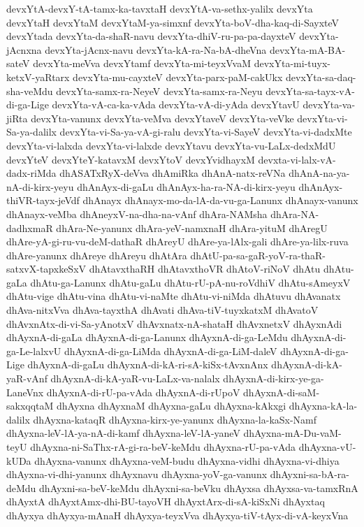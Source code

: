 {devxYtA-devxY-tA-tamx-ka-tavxtaH
devxYtA-va-sethx-yalilx
devxYta
devxYtaH
devxYtaM
devxYtaM-ya-simxnf
devxYta-boV-dha-kaq-di-SayxteV
devxYtada
devxYta-da-shaR-navu
devxYta-dhiV-ru-pa-pa-dayxteV
devxYta-jAcnxna
devxYta-jAcnx-navu
devxYta-kA-ra-Na-bA-dheVna
devxYta-mA-BA-sateV
devxYta-meVva
devxYtamf
devxYta-mi-teyxVvaM
devxYta-mi-tuyx-ketxV-yaRtarx
devxYta-mu-cayxteV
devxYta-parx-paM-cakUkx
devxYta-sa-daq-sha-veMdu
devxYta-samx-ra-NeyeV
devxYta-samx-ra-Neyu
devxYta-sa-tayx-vA-di-ga-Lige
devxYta-vA-ca-ka-vAda
devxYta-vA-di-yAda
devxYtavU
devxYta-va-jiRta
devxYta-vanunx
devxYta-veMva
devxYtaveV
devxYta-veVke
devxYta-vi-Sa-ya-dalilx
devxYta-vi-Sa-ya-vA-gi-ralu
devxYta-vi-SayeV
devxYta-vi-dadxMte
devxYta-vi-lalxda
devxYta-vi-lalxde
devxYtavu
devxYta-vu-LaLx-dedxMdU
devxYteV
devxYteY-katavxM
devxYtoV
devxYvidhayxM
devxta-vi-lalx-vA-dadx-riMda
dhASATxRyX-deVva
dhAmiRka
dhAnA-natx-reVNa
dhAnA-na-ya-nA-di-kirx-yeyu
dhAnAyx-di-gaLu
dhAnAyx-ha-ra-NA-di-kirx-yeyu
dhAnAyx-thiVR-tayx-jeVdf
dhAnayx
dhAnayx-mo-da-lA-da-vu-ga-Lanunx
dhAnayx-vanunx
dhAnayx-veMba
dhAneyxV-na-dha-na-vAnf
dhAra-NAMsha
dhAra-NA-dadhxmaR
dhAra-Ne-yanunx
dhAra-yeV-namxnaH
dhAra-yituM
dhAregU
dhAre-yA-gi-ru-vu-deM-dathaR
dhAreyU
dhAre-ya-lAlx-gali
dhAre-ya-lilx-ruva
dhAre-yanunx
dhAreye
dhAreyu
dhAtAra
dhAtU-pa-sa-gaR-yoV-ra-thaR-satxvX-tapxkeSxV
dhAtavxthaRH
dhAtavxthoVR
dhAtoV-riNoV
dhAtu
dhAtu-gaLa
dhAtu-ga-Lanunx
dhAtu-gaLu
dhAtu-rU-pA-nu-roVdhiV
dhAtu-sAmeyxV
dhAtu-vige
dhAtu-vina
dhAtu-vi-naMte
dhAtu-vi-niMda
dhAtuvu
dhAvanatx
dhAva-nitxVva
dhAva-tayxthA
dhAvati
dhAva-tiV-tuyxkatxM
dhAvatoV
dhAvxnAtx-di-vi-Sa-yAnotxV
dhAvxnatx-nA-shataH
dhAvxnetxV
dhAyxnAdi
dhAyxnA-di-gaLa
dhAyxnA-di-ga-Lanunx
dhAyxnA-di-ga-LeMdu
dhAyxnA-di-ga-Le-lalxvU
dhAyxnA-di-ga-LiMda
dhAyxnA-di-ga-LiM-daleV
dhAyxnA-di-ga-Lige
dhAyxnA-di-gaLu
dhAyxnA-di-kA-ri-sA-kiSx-tAvxnAnx
dhAyxnA-di-kA-yaR-vAnf
dhAyxnA-di-kA-yaR-vu-LaLx-va-nalalx
dhAyxnA-di-kirx-ye-ga-LaneVnx
dhAyxnA-di-rU-pa-vAda
dhAyxnA-di-rUpoV
dhAyxnA-di-saM-sakxqqtaM
dhAyxna
dhAyxnaM
dhAyxna-gaLu
dhAyxna-kAkxgi
dhAyxna-kA-la-dalilx
dhAyxna-kataqR
dhAyxna-kirx-ye-yanunx
dhAyxna-la-kaSx-Namf
dhAyxna-leV-lA-ya-nA-di-kamf
dhAyxna-leV-lA-yaneV
dhAyxna-mA-Du-vaM-teyU
dhAyxna-ni-SaThx-rA-gi-ra-beV-keMdu
dhAyxna-rU-pa-vAda
dhAyxna-vU-kUDa
dhAyxna-vanunx
dhAyxna-veM-budu
dhAyxna-vidhi
dhAyxna-vi-dhiya
dhAyxna-vi-dhi-yanunx
dhAyxnavu
dhAyxna-yoV-ga-vanunx
dhAyxni-sa-bA-ra-deMdu
dhAyxni-sa-beV-keMdu
dhAyxni-sa-beVku
dhAyxsa
dhAyxsa-va-tamxRnA
dhAyxtA
dhAyxtAmx-dhi-BU-tayoVH
dhAyxtArx-di-sA-kiSxNi
dhAyxtaq
dhAyxya
dhAyxya-mAnaH
dhAyxya-teyxVva
dhAyxya-tiV-tAyx-di-vA-keyxVna
}
